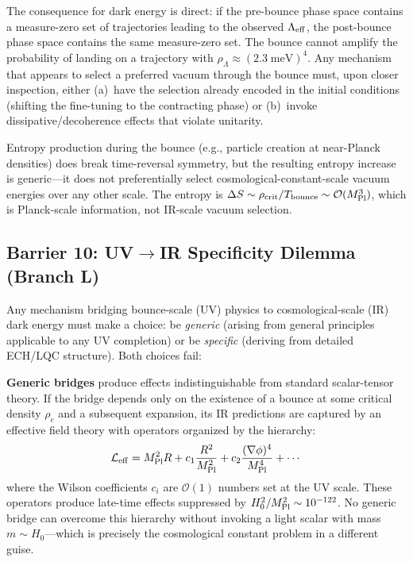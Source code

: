 \documentclass[aps,prd,twocolumn,superscriptaddress,showpacs,preprintnumbers,nofootinbib,longbibliography,floatfix]{revtex4-2}
\newcommand{\MPl}{M_{\rm Pl}}
\begin{document}
The consequence for dark energy is direct: if the pre-bounce phase space contains a measure-zero set of trajectories leading to the observed $\Lambda_{\rm eff}$, the post-bounce phase space contains the same measure-zero set. The bounce cannot amplify the probability of landing on a trajectory with $\rho_\Lambda \approx (2.3\;\text{meV})^4$. Any mechanism that appears to select a preferred vacuum through the bounce must, upon closer inspection, either (a)~have the selection already encoded in the initial conditions (shifting the fine-tuning to the contracting phase) or (b)~invoke dissipative/decoherence effects that violate unitarity.

Entropy production during the bounce (e.g., particle creation at near-Planck densities) does break time-reversal symmetry, but the resulting entropy increase is generic---it does not preferentially select cosmological-constant-scale vacuum energies over any other scale. The entropy is $\Delta S \sim \rho_{\rm crit}/T_{\rm bounce} \sim \mathcal{O}(\MPl^3)$, which is Planck-scale information, not IR-scale vacuum selection.

\subsection{Barrier 10: UV$\to$IR Specificity Dilemma (Branch L)}

Any mechanism bridging bounce-scale (UV) physics to cosmological-scale (IR) dark energy must make a choice: be \emph{generic} (arising from general principles applicable to any UV completion) or be \emph{specific} (deriving from detailed ECH/LQC structure). Both choices fail:

\textbf{Generic bridges} produce effects indistinguishable from standard scalar-tensor theory. If the bridge depends only on the existence of a bounce at some critical density $\rho_c$ and a subsequent expansion, its IR predictions are captured by an effective field theory with operators organized by the hierarchy:
\begin{equation}
\mathcal{L}_{\rm eff} = \MPl^2 R + c_1 \frac{R^2}{\MPl^2} + c_2 \frac{(\nabla\phi)^4}{\MPl^4} + \cdots
\end{equation}
where the Wilson coefficients $c_i$ are $\mathcal{O}(1)$ numbers set at the UV scale. These operators produce late-time effects suppressed by $H_0^2/\MPl^2 \sim 10^{-122}$. No generic bridge can overcome this hierarchy without invoking a light scalar with mass $m \sim H_0$---which is precisely the cosmological constant problem in a different guise.
\end{document}
